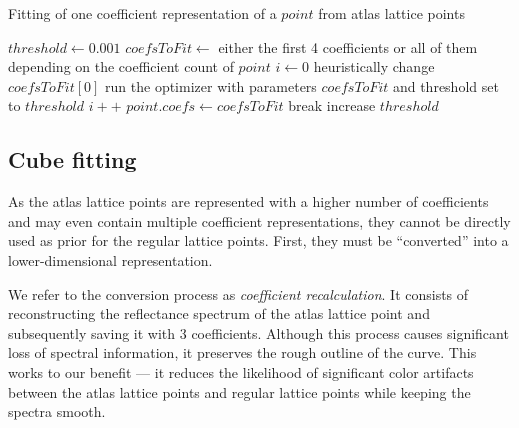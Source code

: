 \begin{algorithm}[t!]
	\caption{Fitting of one coefficient representation of a $point$ from atlas lattice points}
	\label{alg:fittingAtlasLatticePoints}
	\begin{algorithmic}[1]
		\State $threshold \gets 0.001$
		\State $coefsToFit \gets$ either the first 4 coefficients or all of them depending on the coefficient count of $point$
		\State $i \gets 0$
		\State heuristically change $coefsToFit[0]$
		\State run the optimizer with parameters $coefsToFit$ and threshold set to $threshold$
		\State $i++$
		\EndWhile
		\State $point.coefs \gets coefsToFit$
		\State break
		\EndIf
		\State increase $threshold$
		\EndWhile
	\end{algorithmic}
\end{algorithm}

\subsection{Cube fitting} \label{ssec:cubeFitting}

As the atlas lattice points are represented with a higher number of coefficients and may even contain multiple coefficient representations, they cannot be directly used as prior for the regular lattice points. First, they must be ``converted'' into a lower-dimensional representation.

We refer to the conversion process as \emph{coefficient recalculation}. It consists of reconstructing the reflectance spectrum of the atlas lattice point and subsequently saving it with 3 coefficients. Although this process causes significant loss of spectral information, it preserves the rough outline of the curve. This works to our benefit --- it reduces the likelihood of significant color artifacts between the atlas lattice points and regular lattice points while keeping the spectra smooth.

